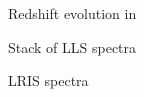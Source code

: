 \documentclass[12pt,preprint]{aastex}
\begin{document}
\begin{figure}
\caption{Redshift evolution in \lzlls
}
\label{fig:zloz}
\end{figure}


\begin{figure}
\caption{Stack of LLS spectra
}
\label{fig:stack}
\end{figure}

\begin{figure}
\caption{LRIS spectra
}
\label{fig:lris}
\end{figure}


\end{document}
